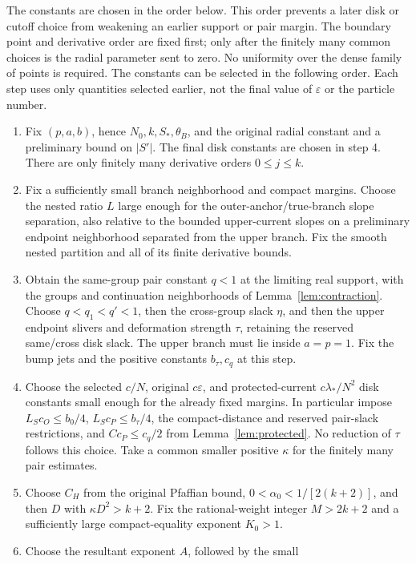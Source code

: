 \documentclass[11pt]{article}
\numberwithin{equation}{section}
\theoremstyle{definition}
\newcommand{\eps}{\varepsilon}
\begin{document}
The constants are chosen in the order below. This order prevents a
later disk or cutoff choice from weakening an earlier support or pair
margin. The boundary point and derivative order are fixed first; only
after the finitely many common choices is the radial parameter sent to
zero. No uniformity over the dense family of points is required.
The constants can be selected in the following order. Each step
uses only quantities selected earlier, not the final value of
\(\eps\) or the particle number.
\begin{enumerate}
\item Fix \((p,a,b)\), hence \(N_0,k,S_*,\theta_B\), and the
original radial constant and a preliminary bound on \(|S'|\).
The final disk constants are chosen in step 4. There are only finitely many
derivative orders \(0\le j\le k\).
\item Fix a sufficiently small branch neighborhood and compact
margins. Choose the nested ratio \(L\) large enough for the
outer-anchor/true-branch slope separation, also relative to the
bounded upper-current slopes on a preliminary endpoint neighborhood
separated from the upper branch. Fix the smooth nested
partition and all of its finite derivative bounds.
\item Obtain the same-group pair constant \(q<1\) at the limiting
real support, with the groups and continuation neighborhoods of
Lemma~\ref{lem:contraction}. Choose \(q<q_1<q'<1\), then the cross-group slack
\(\eta\), and then the upper endpoint slivers and deformation
strength \(\tau\), retaining the reserved same/cross disk slack.
The upper branch must lie inside \(a=p=1\). Fix the bump jets
and the positive constants \(b_\tau,c_q\) at this step.
\item Choose the selected \(c/N\), original \(c\eps\), and
protected-current \(c\lambda_*/N^2\) disk constants small enough
for the already fixed margins. In particular impose
\(L_Sc_O\le b_0/4\), \(L_Sc_P\le b_\tau/4\), the
compact-distance and reserved pair-slack restrictions, and
\(Cc_P\le c_q/2\) from Lemma~\ref{lem:protected}.
No reduction of \(\tau\) follows this choice. Take a common smaller positive
\(\kappa\) for the finitely many pair estimates.
\item Choose \(C_H\) from the original Pfaffian bound,
\(0<\alpha_0<1/[2(k+2)]\), and then \(D\) with
\(\kappa D^2>k+2\). Fix the rational-weight integer \(M>2k+2\)
and a sufficiently large compact-equality exponent \(K_0>1\).
\item Choose the resultant exponent \(A\), followed by the small

\end{enumerate}
\end{document}
